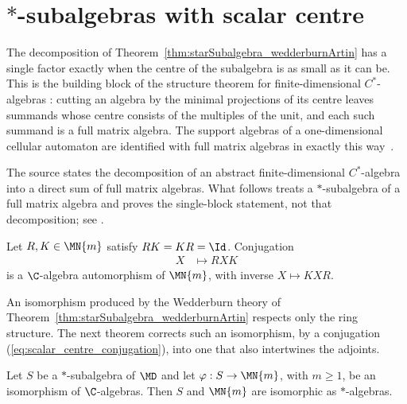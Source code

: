 \section{$*$-subalgebras with scalar centre}

The decomposition of Theorem~\ref{thm:starSubalgebra_wedderburnArtin} has a
single factor exactly when the centre of the subalgebra is as small as it can
be. This is the building block of the structure theorem for finite-dimensional
$C^*$-algebras \cite[lines~2082--2098]{SchumacherWerner2004}: cutting an
algebra by the minimal projections of its centre leaves summands whose centre
consists of the multiples of the unit, and each such summand is a full matrix
algebra. The support algebras of a one-dimensional cellular automaton are
identified with full matrix algebras in exactly this
way~\cite[lines~1278--1282]{GrossNesmeVogtsWerner2012}.

The source states the decomposition of an abstract finite-dimensional
$C^*$-algebra into a direct sum of full matrix algebras. What follows treats a
$*$-subalgebra of a full matrix algebra and proves the single-block statement,
not that decomposition; see \cite{gap:sw04_csform_matrix_scope}.

\begin{definition}%
    \label{def:matrix_innerAlgEquiv}
    \leanok
    Let $R,K\in\MN{m}$ satisfy $RK=KR=\Id$. Conjugation
    \begin{align}
        X
         & \longmapsto RXK
        \label{eq:scalar_centre_conjugation}
    \end{align}
    is a $\C$-algebra automorphism of $\MN{m}$, with inverse $X\mapsto KXR$.
\end{definition}

An isomorphism produced by the Wedderburn theory of
Theorem~\ref{thm:starSubalgebra_wedderburnArtin} respects only the ring
structure. The next theorem corrects such an isomorphism, by a conjugation
(\ref{eq:scalar_centre_conjugation}), into one that also intertwines the
adjoints.

\begin{theorem}%
    \label{thm:starSubalgebra_starAlgEquiv_of_algEquiv_matrix}
    \leanok
    Let $S$ be a $*$-subalgebra of $\MD$ and let $\varphi:S\to\MN{m}$, with
    $m\geq1$, be an isomorphism of $\C$-algebras. Then $S$ and $\MN{m}$ are
    isomorphic as $*$-algebras.
\end{theorem}

